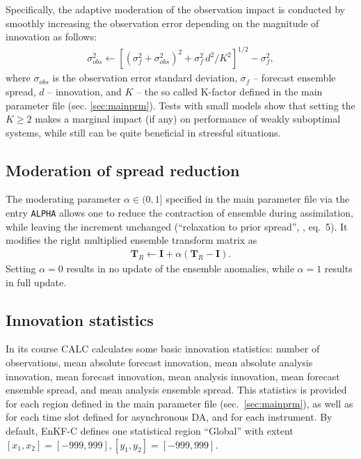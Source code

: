 \documentclass[11pt]{report}
\newcommand{\mb} {\mathbf}
\begin{document}
Specifically, the adaptive moderation of the observation impact is conducted by smoothly increasing the observation error depending on the magnitude of innovation as follows:
\begin{align*}
  \sigma^2_{obs} \leftarrow \left[(\sigma_{f}^2 + \sigma_{obs}^2)^2 + \sigma_f^2 \, d^2 / K^2\right]^{1/2} - \sigma_f^2,
\end{align*}
where $\sigma_{obs}$ is the observation error standard deviation, $\sigma_f$ -- forecast ensemble spread, $d$ -- innovation, and $K$ -- the so called K-factor defined in the main parameter file (sec. \ref{sec:mainprm}).
Tests with small models show that setting the $K \ge 2$ makes a marginal impact (if any) on performance of weakly suboptimal systems, while still can be quite beneficial in stressful situations.

\subsection{Moderation of spread reduction}

The moderating parameter $\alpha \in (0, 1]$ specified in the main parameter file via the entry \verb|ALPHA| allows one to reduce the contraction of ensemble during assimilation, while leaving the increment unchanged (``relaxation to prior spread'', \citealt{zha04a}, eq.~5).
It modifies the right multiplied ensemble transform matrix as
\begin{align*}
  \mb T_R \leftarrow \mb I + \alpha (\mb T_R - \mb I).
\end{align*}
Setting $\alpha = 0$ results in no update of the ensemble anomalies, while $\alpha = 1$ results in full update.

\subsection{Innovation statistics}

In its course CALC calculates some basic innovation statistics: number of observations, mean absolute forecast innovation, mean absolute analysis innovation, mean forecast innovation, mean analysis innovation, mean forecast ensemble spread, and mean analysis ensemble spread.
This statistics is provided for each region defined in the main parameter file (sec.~\ref{sec:mainprm}), as well as for each time slot defined for asynchronous DA, and for each instrument.
By default, EnKF-C defines one statistical region ``Global'' with extent $[x_1,x_2] = [-999,999], [y_1,y_2] = [-999,999]$.
\end{document}
